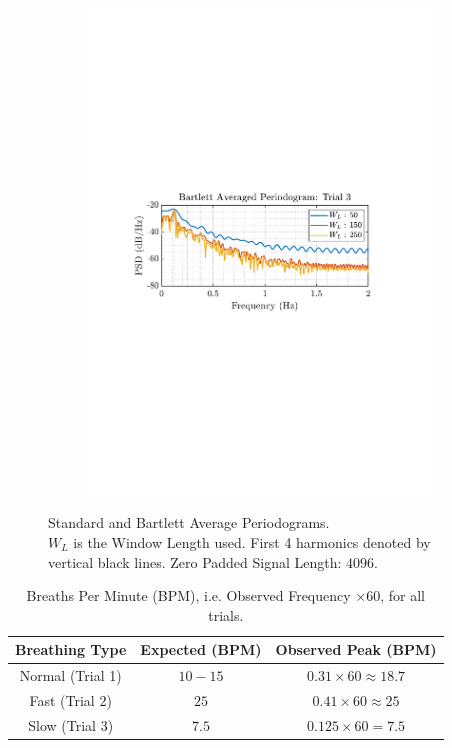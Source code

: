 \documentclass[12pt]{article}
\numberwithin{equation}{section}
\begin{document}
\begin{figure}[H]
\begin{subfigure}{0.49\textwidth}
			\includegraphics[trim={2.2cm 11.2cm 3.15cm  11.2cm}, clip, width=\textwidth]{../MATLAB/figures/q1_5a_fig06.pdf} 
		\end{subfigure}
		\captionsetup{justification=centering}
		\caption{Standard and Bartlett Average Periodograms. \\ 
				$W_L$ is the Window Length used. First 4 harmonics denoted by vertical black lines. Zero Padded Signal Length: $4096$.}
		\label{fig: 1-5a}
	\end{figure}

	\begin{table}[H]
		\centering
		\begin{tabular}{|c|c||c|}
			\hline
			\textbf{Breathing Type} & \textbf{Expected} (BPM) & \textbf{Observed Peak} (BPM) \\
			\hline
			{Normal (Trial 1)} & $10-15$ & $0.31\times60\approx18.7$ \\
			\hline
			{Fast (Trial 2)} & $25$ & $0.41\times60\approx25$ \\
			\hline
			{Slow (Trial 3)} & $7.5$ & $0.125\times60=7.5$ \\
			\hline
		\end{tabular}
		\captionsetup{justification=centering}
		\caption{Breaths Per Minute (BPM), i.e. Observed Frequency $\times 60$, for all trials.}
		\label{tab: 1-5a}
	\end{table}
\end{document}
